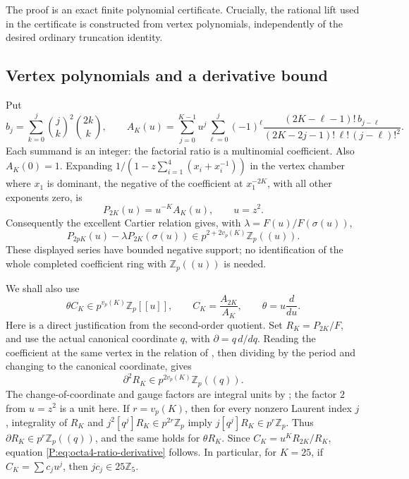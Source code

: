 \documentclass[11pt,a4paper]{article}
\theoremstyle{definition}\newtheorem{definition}[theorem]{Definition}
\theoremstyle{remark}\newtheorem{remark}[theorem]{Remark}
\numberwithin{equation}{section}
\begin{document}
The proof is an exact finite polynomial certificate.  Crucially,
the rational lift used in the certificate is constructed from
vertex polynomials, independently of the desired ordinary
truncation identity.

\subsection{Vertex polynomials and a derivative bound}

Put
\[
 b_j=\sum_{k=0}^{j}\binom jk^2\binom{2k}{k},\qquad
 A_K(u)=\sum_{j=0}^{K-1}u^j
  \sum_{\ell=0}^{j}(-1)^\ell
  \frac{(2K-\ell-1)!\,b_{j-\ell}}
       {(2K-2j-1)!\,\ell!\,(j-\ell)!^2}.
\]
Each summand is an integer: the factorial ratio is a multinomial
coefficient.  Also \(A_K(0)=1\).
Expanding \(1/(1-z\sum_{i=1}^4(x_i+x_i^{-1}))\) in the vertex
chamber where \(x_1\) is dominant, the negative of the coefficient
at \(x_1^{-2K}\), with all other exponents zero, is
\[
 P_{2K}(u)=u^{-K}A_K(u),\qquad u=z^2.
\]
Consequently the excellent Cartier relation
\cite[Theorem 7.3]{BV3} gives, with
\(\lambda=F(u)/F(\sigma(u))\),
\begin{equation}\label{P:eq:octa4-vertex}
 P_{2pK}(u)-\lambda P_{2K}(\sigma(u))
       \in p^{2+2v_p(K)}\mathbb Z_p((u)).
\end{equation}
These displayed series have bounded negative support; no
identification of the whole completed coefficient ring with
\(\mathbb Z_p((u))\) is needed.

We shall also use
\begin{equation}\label{P:eq:octa4-ratio-derivative}
 \theta C_K\in p^{v_p(K)}\mathbb Z_p[[u]],\qquad
 C_K=\frac{A_{2K}}{A_K},\qquad \theta=u\frac{d}{du}.
\end{equation}
Here is a direct justification from the second-order quotient.
Set \(R_K=P_{2K}/F\), and use the actual canonical coordinate
\(q\), with \(\partial=q\,d/dq\).  Reading the coefficient at
the same vertex in the relation of
\cite[Proposition 7.6]{BV3}, then dividing by the period and
changing to the canonical coordinate, gives
\[
 \partial^2R_K\in p^{2v_p(K)}\mathbb Z_p((q)).
\]
The change-of-coordinate and gauge factors are integral units
by \cite[Proposition 7.9 and Corollary 7.11]{BV3}; the factor
\(2\) from \(u=z^2\) is a unit here.  If \(r=v_p(K)\), then for
every nonzero Laurent index \(j\), integrality of \(R_K\) and
\(j^2[q^j]R_K\in p^{2r}\mathbb Z_p\) imply
\(j[q^j]R_K\in p^r\mathbb Z_p\).  Thus
\(\partial R_K\in p^r\mathbb Z_p((q))\), and the same holds
for \(\theta R_K\).  Since
\(C_K=u^K R_{2K}/R_K\), equation
\eqref{P:eq:octa4-ratio-derivative} follows.  In particular, for
\(K=25\), if \(C_K=\sum c_j u^j\), then \(j c_j\in25\mathbb Z_5\).
\end{document}
